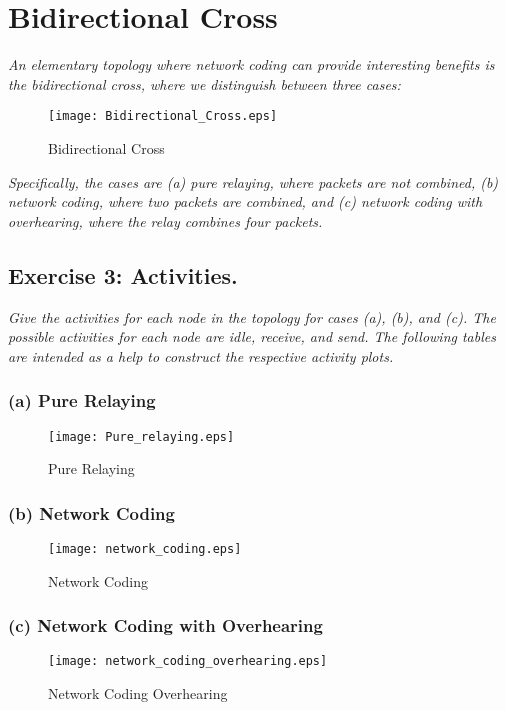 \section{Bidirectional Cross}
\textit{An elementary topology where network coding can provide interesting benefits is the bidirectional cross, where we distinguish between three cases:}\\

\begin{figure}[!h]
  \centering
  \texttt{[image: Bidirectional\_Cross.eps]}
  \caption{Bidirectional Cross}
  \label{fig:Bidirectional_Cross}
\end{figure}

\textit{Specifically, the cases are (a) pure relaying, where packets are not combined, (b) network coding, where two packets are combined, and (c) network coding with overhearing, where the relay combines four packets.}


\subsection{Exercise 3: Activities.}
\textit{Give the activities for each node in the topology for cases (a), (b), and (c). The possible activities for each node are idle, receive, and send. The following tables are intended as a help to construct the respective activity plots.}

\subsubsection{(a) Pure Relaying}
\begin{figure}[!h]
  \centering
  \texttt{[image: Pure\_relaying.eps]}
  \caption{Pure Relaying}
  \label{fig:Pure_relaying}
\end{figure}
\FloatBarrier
\subsubsection{(b) Network Coding}
\begin{figure}[!h]
  \centering
  \texttt{[image: network\_coding.eps]}
  \caption{Network Coding}
  \label{fig:network_coding}
\end{figure}
\newpage
\subsubsection{(c) Network Coding with Overhearing}
\begin{figure}[!h]
  \centering
  \texttt{[image: network\_coding\_overhearing.eps]}
  \caption{Network Coding Overhearing}
  \label{fig:network_coding_overhearing}
\end{figure}

